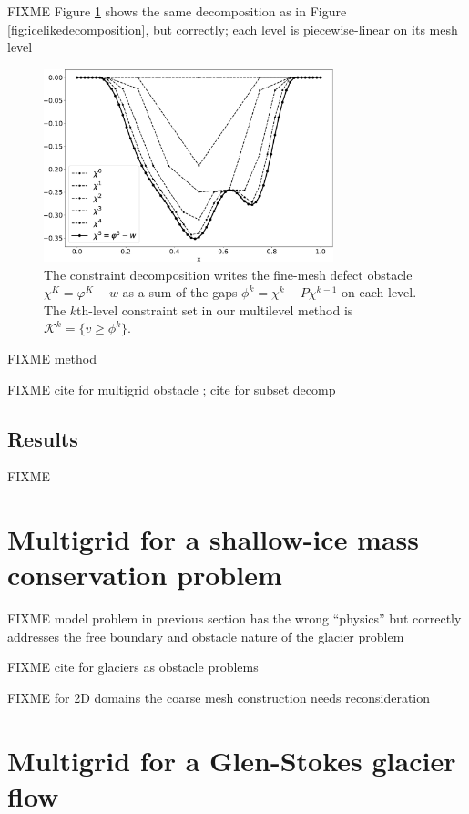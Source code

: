 \documentclass[letterpaper,final,12pt,reqno]{amsart}
\numberwithin{equation}{section}
\numberwithin{figure}{section}
\numberwithin{table}{section}
\begin{document}
FIXME Figure \ref{fig:gooddecomposition} shows the same decomposition as in Figure \ref{fig:icelikedecomposition}, but correctly; each level is piecewise-linear on its mesh level

\begin{figure}
\includegraphics[width=0.75\textwidth]{fixfigs/decomp_defect.pdf}
\caption{The constraint decomposition writes the fine-mesh defect obstacle $\chi^K = \varphi^K - w$ as a sum of the gaps $\phi^k = \chi^k - P\chi^{k-1}$ on each level.  The $k$th-level constraint set in our multilevel method is $\mathcal{K}^k = \{v \ge \phi^k\}$.}
\label{fig:gooddecomposition}
\end{figure}

FIXME \cite{Tai2003} method

FIXME cite for multigrid obstacle \cite{BrandtCryer1983,Bueler2021,GraeserKornhuber2009,Jouvetetal2013}; cite for subset decomp \cite{Tai2003}


\subsection*{Results} FIXME


\section{Multigrid for a shallow-ice mass conservation problem} \label{sec:sia}

FIXME model problem in previous section has the wrong ``physics'' but correctly addresses the free boundary and obstacle nature of the glacier problem

FIXME cite for glaciers as obstacle problems \cite{Bueler2016,Bueler2020,Calvoetal2002,JouvetBueler2012}

FIXME for 2D domains the coarse mesh construction needs reconsideration


\section{Multigrid for a Glen-Stokes glacier flow} \label{sec:stokes}
\end{document}
